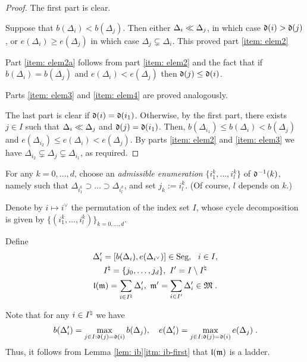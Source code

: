 \documentclass{ert-l} %
\begin{document}
\begin{proof}
The first part is clear.

Suppose that $b(\Delta_i)<b(\Delta_j)$. Then either $\Delta_i\ll\Delta_j$, in which case $\mathfrak{d}(i)>\mathfrak{d}(j)$,
or $e(\Delta_i)\ge e(\Delta_j)$ in which case $\Delta_j\subsetneq\Delta_i$. This proved part \ref{item: elem2}

Part \ref{item: elem2a} follows from part \ref{item: elem2} and the fact that
if $b(\Delta_i)=b(\Delta_j)$ and $e(\Delta_i)<e(\Delta_j)$ then $\mathfrak{d}(j)\le\mathfrak{d}(i)$.

Parts \ref{item: elem3} and \ref{item: elem4} are proved analogously.

The last part is clear if $\mathfrak{d}(i)=\mathfrak{d}(i_1)$. Otherwise, by the first part, there exists $j\in I$ such that $\Delta_i\ll\Delta_j$ and $\mathfrak{d}(j)=\mathfrak{d}(i_1)$.
Then, $b(\Delta_{i_1})\le b(\Delta_i)<b(\Delta_j)$ and $e(\Delta_{i_2})\le e(\Delta_i)<e(\Delta_j)$.
By parts \ref{item: elem2} and \ref{item: elem3} we have $\Delta_{i_2}\subsetneq\Delta_j\subsetneq\Delta_{i_1}$, as required.
\end{proof}


\label{sec: distin}

For any $k=0,\dots,d$, choose an \emph{admissible enumeration} $\{i^k_1,\dots,i^k_l\}$ of $\mathfrak{d}^{-1}(k)$, namely such that
$\Delta_{i^k_1}\supset\dots\supset\Delta_{i^k_l}$, and set $j_k:=i^k_l$. (Of course, $l$ depends on $k$.)


Denote by $i\mapsto i^\vee$ the permutation of the index set $I$, whose cycle decomposition is given by $\{(i^k_1,\dots,i^k_l)\}_{k=0,\dots,d}$.

Define
\begin{subequations} \label{def: Vien}
\begin{gather}
\Delta_i'=[b(\Delta_i),e(\Delta_{i^\vee})]\in \operatorname{Seg},\ \ i\in I,\\
I^{\natural}=\{j_0,\dots,j_d\},\ I'=I\setminus I^{\natural}\\
\mathfrak{l}(\mathfrak{m})=\sum_{i\in I^{\natural}}\Delta'_i,\ \mathfrak{m}'=\sum_{i\in I'}\Delta'_i\in \mathfrak{M}\;.
\end{gather}
\end{subequations}

Note that for any $i\in I^{\natural}$ we have
\begin{equation}\label{eq: max}
b(\Delta'_i)=\max_{j\in I:\mathfrak{d}(j)=\mathfrak{d}(i)}b(\Delta_j),\quad e(\Delta'_i)=\max_{j\in I:\mathfrak{d}(j)=\mathfrak{d}(i)}e(\Delta_j)\;.
\end{equation}
Thus, it follows from Lemma \ref{lem: ib}\eqref{itm: ib-first} that $\mathfrak{l}(\mathfrak{m})$ is a ladder.
\end{document}
